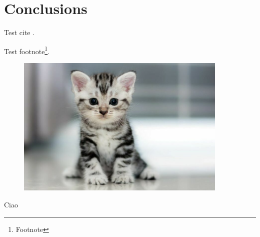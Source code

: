 \chapter{Conclusions}


\lipsum[1-3]

\begin{code}
    \label{code:test}
\end{code}

\lipsum[66]



Test cite \supercite{GOOGLE}.

Test footnote\footnote{Footnote}.

\begin{figure}[h]
    \captionsetup{type=figure}
    \centering
    \includegraphics[width=0.9\textwidth]{./images/example/gattino.png}
    \label{fig:gattino}
\end{figure}

Ciao

\lipsum[66]
